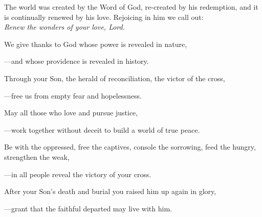 \intercessions\indent

\begin{hangpar}

The world was created by the Word of God, re-created by his redemption, and it is continually renewed by his love. Rejoicing in him we call out:\\
\emph{Renew the wonders of your love, Lord.}

\medskip We give thanks to God whose power is revealed in nature,

{\color{red}---\thinspace}and whose providence is revealed in history.

\medskip Through your Son, the herald of reconciliation, the victor of the cross,

{\color{red}---\thinspace}free us from empty fear and hopelessness.

\medskip May all those who love and pursue justice,

{\color{red}---\thinspace}work together without deceit to build a world of true peace.

\medskip Be with the oppressed, free the captives, console the sorrowing, feed the hungry, strengthen the weak,

{\color{red}---\thinspace}in all people reveal the victory of your cross.

\medskip After your Son’s death and burial you raised him up again in glory,

{\color{red}---\thinspace}grant that the faithful departed may live with him.

\end{hangpar}

